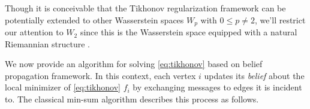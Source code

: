 \documentclass[letterpaper]{article} %
\begin{document}
\begin{remark}
  Though it is conceivable that the Tikhonov regularization framework can be potentially extended to other Wasserstein spaces $W_p$ with $0\leq p\neq 2$, we'll restrict our attention to $W_2$ since this is the Wasserstein space equipped with a natural Riemannian structure \cite{Otto2001,ambrosio2005gradient,LottVillani2009}.
\end{remark}
We now provide an algorithm for solving \eqref{eq:tikhonov} based on belief propagation framework. In this context, each vertex $i$ updates its \textit{belief} about the local minimizer of \eqref{eq:tikhonov} $f_i$ by exchanging messages to edges it is incident to. 
The classical min-sum algorithm \cite{min_Sum} describes this process as follows. 
\end{document}
